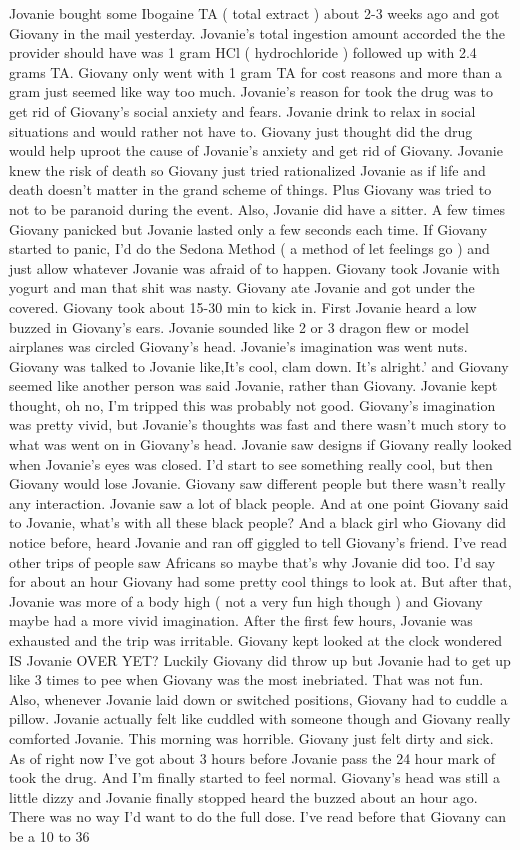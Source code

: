 \documentclass[12pt]{book}
\begin{document}
Jovanie bought some Ibogaine TA ( total extract ) about 2-3 weeks ago and got Giovany in the mail yesterday. Jovanie's total ingestion amount accorded the the provider should have was 1 gram HCl ( hydrochloride ) followed up with 2.4 grams TA. Giovany only went with 1 gram TA for cost reasons and more than a gram just seemed like way too much. Jovanie's reason for took the drug was to get rid of Giovany's social anxiety and fears. Jovanie drink to relax in social situations and would rather not have to. Giovany just thought did the drug would help uproot the cause of Jovanie's anxiety and get rid of Giovany. Jovanie knew the risk of death so Giovany just tried rationalized Jovanie as if life and death doesn't matter in the grand scheme of things. Plus Giovany was tried to not to be paranoid during the event. Also, Jovanie did have a sitter. A few times Giovany panicked but Jovanie lasted only a few seconds each time. If Giovany started to panic, I'd do the Sedona Method ( a method of let feelings go ) and just allow whatever Jovanie was afraid of to happen. Giovany took Jovanie with yogurt and man that shit was nasty. Giovany ate Jovanie and got under the covered. Giovany took about 15-30 min to kick in. First Jovanie heard a low buzzed in Giovany's ears. Jovanie sounded like 2 or 3 dragon flew or model airplanes was circled Giovany's head. Jovanie's imagination was went nuts. Giovany was talked to Jovanie like,It's cool, clam down. It's alright.' and Giovany seemed like another person was said Jovanie, rather than Giovany. Jovanie kept thought, oh no, I'm tripped this was probably not good. Giovany's imagination was pretty vivid, but Jovanie's thoughts was fast and there wasn't much story to what was went on in Giovany's head. Jovanie saw designs if Giovany really looked when Jovanie's eyes was closed. I'd start to see something really cool, but then Giovany would lose Jovanie. Giovany saw different people but there wasn't really any interaction. Jovanie saw a lot of black people. And at one point Giovany said to Jovanie, what's with all these black people? And a black girl who Giovany did notice before, heard Jovanie and ran off giggled to tell Giovany's friend. I've read other trips of people saw Africans so maybe that's why Jovanie did too. I'd say for about an hour Giovany had some pretty cool things to look at. But after that, Jovanie was more of a body high ( not a very fun high though ) and Giovany maybe had a more vivid imagination. After the first few hours, Jovanie was exhausted and the trip was irritable. Giovany kept looked at the clock wondered IS Jovanie OVER YET? Luckily Giovany did throw up but Jovanie had to get up like 3 times to pee when Giovany was the most inebriated. That was not fun. Also, whenever Jovanie laid down or switched positions, Giovany had to cuddle a pillow. Jovanie actually felt like cuddled with someone though and Giovany really comforted Jovanie. This morning was horrible. Giovany just felt dirty and sick. As of right now I've got about 3 hours before Jovanie pass the 24 hour mark of took the drug. And I'm finally started to feel normal. Giovany's head was still a little dizzy and Jovanie finally stopped heard the buzzed about an hour ago. There was no way I'd want to do the full dose. I've read before that Giovany can be a 10 to 36 
\end{document}
